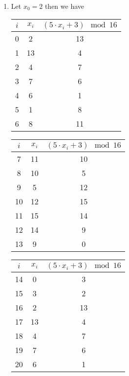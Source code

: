 \documentclass[10pt]{report}
\begin{document}
\begin{enumerate}
	\item 
	Let $x_0=2$ then we have
	\begin{table}[H]
		\centering
		\begin{minipage}{.3\linewidth}
			\centering
			\begin{tabular}{*{3}{c}} 
				\toprule
				$i$ & $x_i$ & $(5 \cdot x_i + 3) \mod 16$ \\ \midrule
				0 & 2 & 13 \\ \midrule
				1 & 13 & 4 \\ \midrule
				2 & 4 & 7 \\ \midrule
				3 & 7 & 6 \\ \midrule
				4 & 6 & 1 \\ \midrule
				5 & 1 & 8 \\ \midrule
				6 & 8 & 11 \\ 
				\bottomrule
			\end{tabular}
		\end{minipage}
		\hspace{-2ex}
		\begin{minipage}{.3\linewidth}
			\centering
			\begin{tabular}{*{3}{c}} 
				\toprule
				$i$ & $x_i$ & $(5 \cdot x_i + 3) \mod 16$ \\ \midrule
				7 & 11 & 10 \\ \midrule
				8 & 10 & 5 \\ \midrule
				9 & 5 & 12 \\ \midrule
				10 & 12 & 15 \\ \midrule
				11 & 15 & 14 \\ \midrule
				12 & 14 & 9 \\ \midrule
				13 & 9 & 0 \\ 
				\bottomrule
			\end{tabular}
		\end{minipage}
		\hspace{-2ex}
		\begin{minipage}{.3\linewidth}
			\centering
			\begin{tabular}{*{3}{c}} 
				\toprule
				$i$ & $x_i$ & $(5 \cdot x_i + 3) \mod 16$ \\ \midrule
				14 & 0 & 3 \\ \midrule
				15 & 3 & 2 \\ \midrule
				16 & 2 & 13 \\ \midrule
				17 & 13 & 4 \\ \midrule
				18 & 4 & 7 \\ \midrule
				19 & 7 & 6 \\ \midrule
				20 & 6 & 1 \\ 
				\bottomrule
			\end{tabular}
		\end{minipage}
	\end{table}
\end{enumerate}
\end{document}
